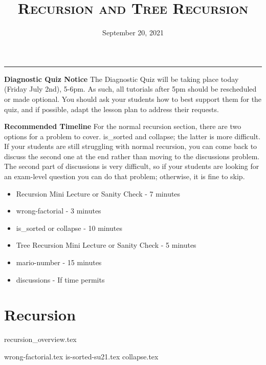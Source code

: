 \documentclass{exam}
\title{\textsc{Recursion and Tree Recursion}}
\date{September 20, 2021}
\begin{document}
\maketitle
\rule{\textwidth}{0.15em}
\fontsize{12}{15}\selectfont

\begin{guide}
\textbf{Diagnostic Quiz Notice}
    \newline
    The Diagnostic Quiz will be taking place today (Friday July 2nd), 5-6pm. As such, all tutorials after 5pm should be rescheduled or made optional.
    You should ask your students how to best support them for the quiz, and if possible, adapt the lesson plan to address their requests.
\end{guide}

\begin{guide}
\textbf{Recommended Timeline}
\newline
For the normal recursion section, there are two options for a problem to cover. is\_sorted and collapse; the latter is more difficult.
If your students are still struggling with normal recursion, you can come back to discuss the second one at the end rather than moving
to the discussions problem. The second part of discussions is very difficult, so if your students are looking for an exam-level question
you can do that problem; otherwise, it is fine to skip.
\begin{itemize}
    \item Recursion Mini Lecture or Sanity Check - 7 minutes
    \item wrong-factorial - 3 minutes
    \item is\_sorted or collapse - 10 minutes
    \item Tree Recursion Mini Lecture or Sanity Check - 5 minutes
    \item mario-number - 15 minutes
    \item discussions - If time permits
\end{itemize}
\end{guide}

\section{Recursion}
{recursion_overview.tex}
\begin{questions}
    {wrong-factorial.tex}
    \pagebreak
    {is-sorted-su21.tex}
    {collapse.tex}
\end{questions}
\end{document}
